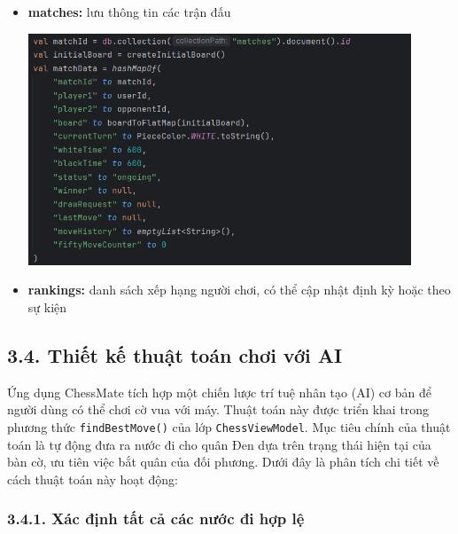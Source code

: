 \documentclass[a4paper,12pt]{article}
\begin{document}
\begin{itemize}[label=·]
\begin{center}
          \end{center}
    \item \textbf{matches:} lưu thông tin các trận đấu
          \begin{center}
              \includegraphics[width=0.9\textwidth]{img/match.png}
          \end{center}
    \item \textbf{rankings:} danh sách xếp hạng người chơi, có thể cập nhật định kỳ hoặc theo sự kiện
\end{itemize}

\subsection*{3.4. Thiết kế thuật toán chơi với AI}

\justify
\noindent Ứng dụng ChessMate tích hợp một chiến lược trí tuệ nhân tạo (AI) cơ bản để người dùng có thể chơi cờ vua với máy. Thuật toán này được triển khai trong phương thức \texttt{findBestMove()} của lớp \texttt{ChessViewModel}. Mục tiêu chính của thuật toán là tự động đưa ra nước đi cho quân Đen dựa trên trạng thái hiện tại của bàn cờ, ưu tiên việc bắt quân của đối phương. Dưới đây là phân tích chi tiết về cách thuật toán này hoạt động:

\subsubsection*{3.4.1. Xác định tất cả các nước đi hợp lệ}
\end{document}
